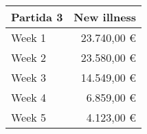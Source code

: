 \begin{center}
    \begin{tabular}{|l|r|}
        \hline
        \toprule
        \textbf{Partida 3} & \textbf{New illness} \\ \hline
        \midrule
        Week 1             & 23.740,00 \euro      \\ \hline
        Week 2             & 23.580,00 \euro      \\  \hline
        Week 3             & 14.549,00 \euro      \\ \hline
        Week 4             & 6.859,00 \euro       \\ \hline
        Week 5             & 4.123,00 \euro       \\ \hline
        \bottomrule
    \end{tabular}
\end{center}
